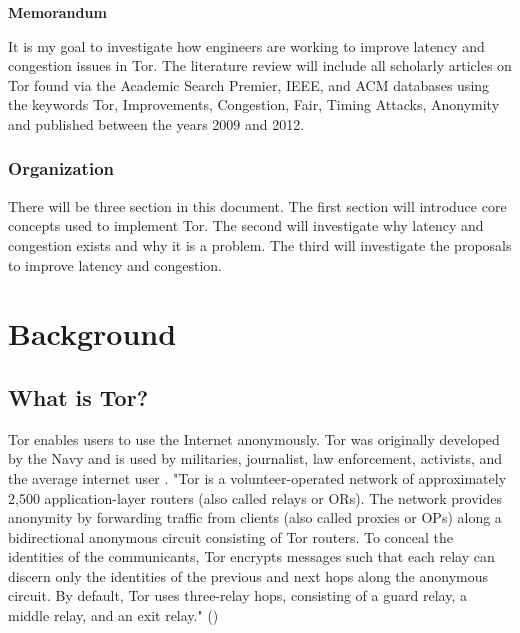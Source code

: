 \documentclass[letterpaper,13pt]{texMemo}
\begin{document}
\singlespace
\begin{center}
\large {\bf Memorandum}
\end{center}
\setlength{\topmargin}{0in}
\maketitle

It is my goal to investigate how engineers are working to improve latency and congestion issues in
Tor. The literature review will include all scholarly articles on Tor found via the Academic Search
Premier, IEEE, and ACM databases using the keywords Tor, Improvements, Congestion, Fair, Timing
Attacks, Anonymity and published between the years 2009 and 2012.

\subsubsection*{Organization}
There will be three section in this document. The first section will introduce core concepts used to
implement Tor. The second will investigate why latency and congestion exists and why it is a
problem. The third will investigate the proposals to improve latency and congestion.

\section*{Background}

    \subsection*{What is Tor?}
    Tor enables users to use the Internet anonymously. Tor was originally developed by the Navy
    and is used by militaries, journalist, law enforcement, activists, and the average internet user
    \citep[2]{Tor:web}. 
    "Tor is a volunteer-operated network of approximately 2,500 application-layer routers (also
    called relays or ORs). The network provides anonymity by forwarding traffic from clients (also
    called proxies or OPs) along a bidirectional anonymous circuit consisting of Tor routers. To
    conceal the identities of the communicants, Tor encrypts messages such that each relay can
    discern only the identities of the previous and next hops along the anonymous circuit.  By
    default, Tor uses three-relay hops, consisting of a guard relay, a middle relay, and an exit
    relay." (\citeauthor[1]{Moore})
\end{document}

